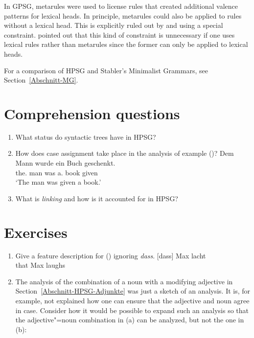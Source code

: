 In GPSG, metarules were used to license rules that created additional valence patterns for lexical heads. In principle, metarules could also be applied
to rules without a lexical head. This is explicitly ruled out by \citet{Flickinger83a-u} and
\citet[]{GKPS85a} using a  special constraint.
\citet*[]{FPW85a} pointed out that this kind of constraint is unnecessary if one uses lexical rules rather than metarules since the former can only
be applied to lexical heads.

For a comparison of HPSG and Stabler's Minimalist Grammars\indexmg, see
Section~\ref{Abschnitt-MG}.%


\section*{Comprehension questions}

\begin{enumerate}
\item What status do syntactic trees have in HPSG?
\item How does case assignment take place in the analysis of example ()?
\ea
\gll Dem Mann wurde ein Buch geschenkt.\\
	 the.\dat{} man was a.\nom{} book given\\
\glt `The man was given a book.'
\z
\item What is \emph{linking} and how is it accounted for in HPSG?
\end{enumerate}


\section*{Exercises}

\begin{enumerate}
\item Give a feature description for () ignoring \emph{dass}.
\ea
\gll {}[dass] Max lacht\\
	 {}\spacebr{}that Max laughs\\
\z
\item The analysis of the combination of a noun with a modifying adjective in Section~\ref{Abschnitt-HPSG-Adjunkte} was just a sketch of an analysis.
It is, for example, not explained how one can ensure that the adjective and noun agree in case. Consider how it would be possible to expand such an
analysis so that the adjective"=noun combination in (a) can be analyzed, but not the one in (b):
\eal
{}
\zl

\end{enumerate}



